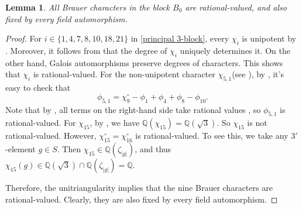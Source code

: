 \documentclass[11pt,a4paper]{article}
\numberwithin{equation}{section}
\newtheorem{lemma}[theorem]{Lemma}
\theoremstyle{definition}
\theoremstyle{remark}
\newcommand{\QQ}{\mathbb Q}
\begin{document}
\begin{lemma}\label{eq:nine}
All Brauer characters in the block $B_0$ are rational-valued, and also fixed by every field automorphism.
\end{lemma}
\begin{proof}
For $i\in\{1,4,7,8,10,18,21\}$ in \eqref{principal 3-block}, every \(\chi_i\) is unipotent by \cite[Section 4]{Himstedt}. Moreover, it follows from \cite[Table A.1]{Himstedt} that the degree of $\chi_i$ uniquely determines it. On the other hand, Galois automorphisms preserve degrees of characters. This shows that \(\chi_i \) is rational-valued. 
For the non-unipotent character $\chi_{5,1}$(see \cite[Table A.2]{Himstedt}), by \cite[Table~C.5]{Himstedt}, it's easy to 
check that 
\[
\phi_{5,1}
=\chi_9^\circ-\phi_1+\phi_4+\phi_8-\phi_{10}.
\]
Note that by \cite[Table A.1]{Himstedt}, all terms on the right-hand side take rational values , so \(\phi_{5,1}\) is rational-valued.
For $\chi_{15}$, by \cite[Table~A.1]{Himstedt}, we have
$\QQ (\chi_{15})=\QQ(\sqrt{3})$. So $\chi_{15}$ is not rational-valued. However, $\chi_{15}^{\circ}=\chi_{16}^\circ$ is rational-valued. 
To see this, we take any $3'$-element \(g\in S\). Then $\chi_{15}\in\QQ(\zeta_{|g|})$, and thus $\chi_{15}(g)\in
\mathbb Q(\sqrt{3})\cap\mathbb Q(\zeta_{|g|})=\mathbb Q$. 

Therefore, the unitriangularity implies that the nine Brauer characters are rational-valued. Clearly, they are also fixed by every field automorphism.
\end{proof}
\end{document}
